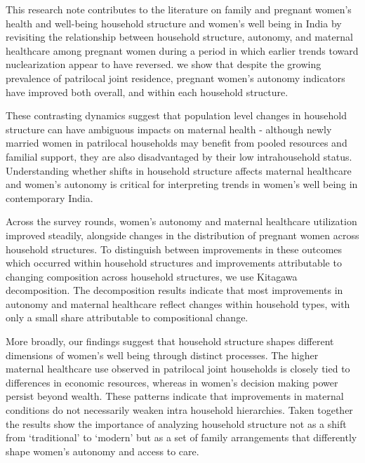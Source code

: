This research note contributes to the literature on family and pregnant women's health and well-being household structure and women’s well being in India by revisiting the relationship between household structure, autonomy, and maternal healthcare among pregnant women during a period in which earlier trends toward nuclearization appear to have reversed. we show that despite the growing prevalence of patrilocal joint residence, pregnant women's autonomy indicators have improved both overall, and within each household structure. 

These contrasting dynamics suggest that population level changes in household structure can have ambiguous impacts on maternal health - although newly married women in patrilocal households may benefit from pooled resources and familial support, they are also disadvantaged by their low intrahousehold status. Understanding whether shifts in household structure affects maternal healthcare and women’s autonomy is critical for interpreting trends in women’s well being in contemporary India. 

Across the survey rounds, women’s autonomy and maternal healthcare utilization improved steadily, alongside changes in the distribution of pregnant women across household structures. To distinguish between improvements in these outcomes which occurred within household structures and improvements attributable to changing composition across household structures, we use Kitagawa decomposition.  The decomposition results indicate that most improvements in autonomy and maternal healthcare reflect changes within household types, with only a small share attributable to compositional change. 



More broadly, our findings suggest that household structure shapes different dimensions of women’s well being through distinct processes. The higher maternal healthcare use observed in patrilocal joint households is closely tied to differences in economic resources, whereas  in women’s decision making power persist beyond wealth. These patterns indicate that improvements in maternal conditions do not necessarily weaken intra household hierarchies. Taken together the results show the importance of analyzing household structure not as a shift from ‘traditional’ to ‘modern’ but as a set of family arrangements that differently shape women’s autonomy and access to care. 